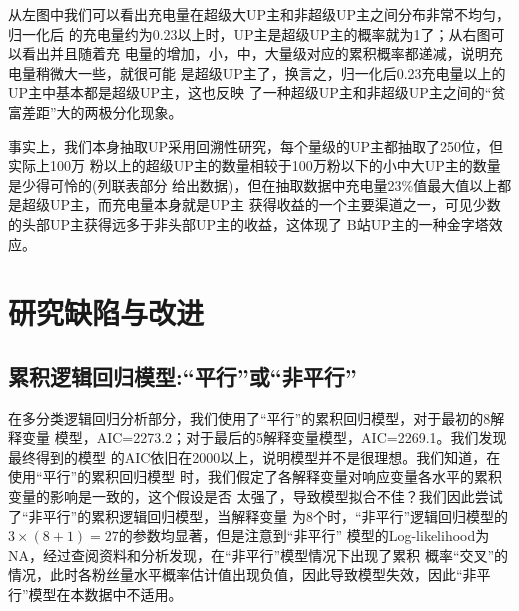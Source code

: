 \documentclass{ctexart}
\begin{document}
从左图中我们可以看出充电量在超级大UP主和非超级UP主之间分布非常不均匀，归一化后
的充电量约为0.23以上时，UP主是超级UP主的概率就为1了；从右图可以看出并且随着充
电量的增加，小，中，大量级对应的累积概率都递减，说明充电量稍微大一些，就很可能
是超级UP主了，换言之，归一化后0.23充电量以上的UP主中基本都是超级UP主，这也反映
了一种超级UP主和非超级UP主之间的“贫富差距”大的两极分化现象。

事实上，我们本身抽取UP采用回溯性研究，每个量级的UP主都抽取了250位，但实际上100万
粉以上的超级UP主的数量相较于100万粉以下的小中大UP主的数量是少得可怜的(列联表部分
给出数据)，但在抽取数据中充电量23\%值最大值以上都是超级UP主，而充电量本身就是UP主
获得收益的一个主要渠道之一，可见少数的头部UP主获得远多于非头部UP主的收益，这体现了
B站UP主的一种金字塔效应。

\section{研究缺陷与改进}

\subsection{累积逻辑回归模型:“平行”或“非平行”}

在多分类逻辑回归分析部分，我们使用了“平行”的累积回归模型，对于最初的8解释变量
模型，AIC=2273.2；对于最后的5解释变量模型，AIC=2269.1。我们发现最终得到的模型
的AIC依旧在2000以上，说明模型并不是很理想。我们知道，在使用“平行”的累积回归模型
时，我们假定了各解释变量对响应变量各水平的累积变量的影响是一致的，这个假设是否
太强了，导致模型拟合不佳？我们因此尝试了“非平行”的累积逻辑回归模型，当解释变量
为8个时，“非平行”逻辑回归模型的$3\times(8+1)=27$的参数均显著，但是注意到“非平行”
模型的Log-likelihood为NA，经过查阅资料和分析发现，在“非平行”模型情况下出现了累积
概率“交叉”的情况，此时各粉丝量水平概率估计值出现负值，因此导致模型失效，因此“非平
行”模型在本数据中不适用。
\end{document}
